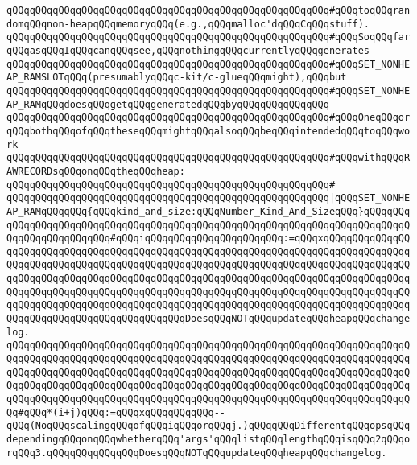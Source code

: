 \verb|qQQqqQQqqQQqqQQqqQQqqQQqqQQqqQQqqQQqqQQqqQQqqQQqqQQqqQQq#qQQqtoqQQqrandomqQQqnon-heapqQQqmemoryqQQq(e.g.,qQQqmalloc'dqQQqCqQQqstuff).|\newline
\verb|qQQqqQQqqQQqqQQqqQQqqQQqqQQqqQQqqQQqqQQqqQQqqQQqqQQqqQQq#qQQqSoqQQqfarqQQqasqQQqIqQQqcanqQQqsee,qQQqnothingqQQqcurrentlyqQQqgenerates|\newline
\verb|qQQqqQQqqQQqqQQqqQQqqQQqqQQqqQQqqQQqqQQqqQQqqQQqqQQqqQQq#qQQqSET_NONHEAP_RAMSLOTqQQq(presumablyqQQqc-kit/c-glueqQQqmight),qQQqbut|\newline
\verb|qQQqqQQqqQQqqQQqqQQqqQQqqQQqqQQqqQQqqQQqqQQqqQQqqQQqqQQq#qQQqSET_NONHEAP_RAMqQQqdoesqQQqgetqQQqgeneratedqQQqbyqQQqqQQqqQQqqQQq|\newline
\verb|qQQqqQQqqQQqqQQqqQQqqQQqqQQqqQQqqQQqqQQqqQQqqQQqqQQqqQQq#qQQqOneqQQqorqQQqbothqQQqofqQQqtheseqQQqmightqQQqalsoqQQqbeqQQqintendedqQQqtoqQQqwork|\newline
\verb|qQQqqQQqqQQqqQQqqQQqqQQqqQQqqQQqqQQqqQQqqQQqqQQqqQQqqQQq#qQQqwithqQQqRAWRECORDsqQQqonqQQqtheqQQqheap:|\newline
\verb|qQQqqQQqqQQqqQQqqQQqqQQqqQQqqQQqqQQqqQQqqQQqqQQqqQQqqQQq#|\newline
\verb|qQQqqQQqqQQqqQQqqQQqqQQqqQQqqQQqqQQqqQQqqQQqqQQqqQQqqQQq|\verb#|qQQqSET_NONHEAP_RAMqQQqqQQq{qQQqkind_and_size:qQQqNumber_Kind_And_SizeqQQq}qQQqqQQqqQQqqQQqqQQqqQQqqQQqqQQqqQQqqQQqqQQqqQQqqQQqqQQqqQQqqQQqqQQqqQQqqQQqqQQqqQQqqQQqqQQqqQQq#\verb|#qQQqiqQQqqQQqqQQqqQQqqQQqqQQq:=qQQqxqQQqqQQqqQQqqQQqqQQqqQQqqQQqqQQqqQQqqQQqqQQqqQQqqQQqqQQqqQQqqQQqqQQqqQQqqQQqqQQqqQQqqQQqqQQqqQQqqQQqqQQqqQQqqQQqqQQqqQQqqQQqqQQqqQQqqQQqqQQqqQQqqQQqqQQqqQQqqQQqqQQqqQQqqQQqqQQqqQQqqQQqqQQqqQQqqQQqqQQqqQQqqQQqqQQqqQQqqQQqqQQqqQQqqQQqqQQqqQQqqQQqqQQqqQQqqQQqqQQqqQQqqQQqqQQqqQQqqQQqqQQqqQQqqQQqqQQqqQQqqQQqqQQqqQQqqQQqqQQqqQQqqQQqqQQqqQQqqQQqqQQqqQQqqQQqqQQqqQQqqQQqqQQqqQQqqQQqqQQqqQQqqQQqqQQqqQQqDoesqQQqNOTqQQqupdateqQQqheapqQQqchangelog.|\newline
\verb|qQQqqQQqqQQqqQQqqQQqqQQqqQQqqQQqqQQqqQQqqQQqqQQqqQQqqQQqqQQqqQQqqQQqqQQqqQQqqQQqqQQqqQQqqQQqqQQqqQQqqQQqqQQqqQQqqQQqqQQqqQQqqQQqqQQqqQQqqQQqqQQqqQQqqQQqqQQqqQQqqQQqqQQqqQQqqQQqqQQqqQQqqQQqqQQqqQQqqQQqqQQqqQQqqQQqqQQqqQQqqQQqqQQqqQQqqQQqqQQqqQQqqQQqqQQqqQQqqQQqqQQqqQQqqQQqqQQqqQQqqQQqqQQqqQQqqQQqqQQqqQQqqQQqqQQqqQQqqQQqqQQqqQQqqQQqqQQqqQQqqQQqqQQqqQQq#qQQq*(i+j)qQQq:=qQQqxqQQqqQQqqQQq--qQQq(NoqQQqscalingqQQqofqQQqiqQQqorqQQqj.)qQQqqQQqDifferentqQQqopsqQQqdependingqQQqonqQQqwhetherqQQq'args'qQQqlistqQQqlengthqQQqisqQQq2qQQqorqQQq3.qQQqqQQqqQQqqQQqDoesqQQqNOTqQQqupdateqQQqheapqQQqchangelog.|\newline
